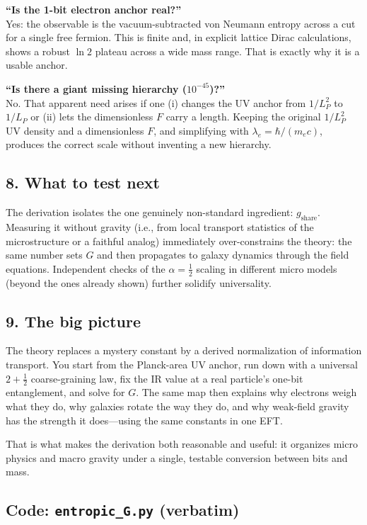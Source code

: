\documentclass[11pt]{article}
\begin{document}
\textbf{“Is the 1-bit electron anchor real?”}\\
Yes: the observable is the vacuum-subtracted von Neumann entropy across a cut for a single free fermion. This is finite and, in explicit lattice Dirac calculations, shows a robust $\ln 2$ plateau across a wide mass range. That is exactly why it is a usable anchor.

\textbf{“Is there a giant missing hierarchy ($10^{-45}$)?”}\\
No. That apparent need arises if one (i) changes the UV anchor from $1/L_P^2$ to $1/L_P$ or (ii) lets the dimensionless $F$ carry a length. Keeping the original $1/L_P^2$ UV density and a dimensionless $F$, and simplifying with $\lambda_e=\hbar/(m_e c)$, produces the correct scale without inventing a new hierarchy.

\subsection*{8. What to test next}

The derivation isolates the one genuinely non-standard ingredient: $g_{\mathrm{share}}$. Measuring it without gravity (i.e., from local transport statistics of the microstructure or a faithful analog) immediately over-constrains the theory: the same number sets $G$ and then propagates to galaxy dynamics through the field equations. Independent checks of the $\alpha=\tfrac12$ scaling in different micro models (beyond the ones already shown) further solidify universality.

\subsection*{9. The big picture}

The theory replaces a mystery constant by a derived normalization of information transport. You start from the Planck-area UV anchor, run down with a universal $2+\tfrac12$ coarse-graining law, fix the IR value at a real particle’s one-bit entanglement, and solve for $G$. The same map then explains why electrons weigh what they do, why galaxies rotate the way they do, and why weak-field gravity has the strength it does—using the same constants in one EFT.

That is what makes the derivation both reasonable and useful: it organizes micro physics and macro gravity under a single, testable conversion between bits and mass.

\subsection*{Code: \texttt{entropic\_G.py} (verbatim)}
\end{document}
